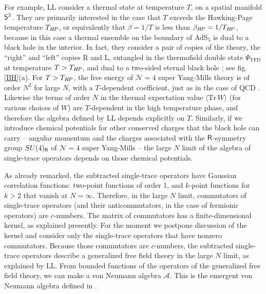 \documentclass[11pt,a4paper]{article}
\def\HP{{H\negthinspace P}}
\def\A{{\mathcal A}}
\def\S{{\sf S}}
\def\N{{\mathcal N}}
\def\la{\langle}
\def\ra{\rangle}
\def\Tr{\mathrm{Tr}}
\def\TFD{{\mathrm{TFD}}}
\def\Rr{{\sf R}}
\begin{document}
 For example, LL consider a thermal state at temperature $T$, on a spatial manifold $\S^3$.   They are primarily
interested in the case that $T$ exceeds the Hawking-Page temperature
$T_\HP$, or equivalently  that $\beta=1/T$ is less than $\beta_\HP=1/T_\HP$,
because in this case  a thermal ensemble on the boundary of AdS$_5$ is dual to a black hole in the interior.    In fact, they consider a pair of
copies of the theory, the ``right'' and ``left'' copies R and L, entangled in the thermofield double state $\Psi_\TFD$ at temperature $T>T_\HP$, and dual to
a two-sided eternal black hole \cite{Malda}; see fig. \ref{BH}(a).
For $T>T_\HP$, the free energy of $\N=4$ super Yang-Mills theory is of order $N^2$ for large $N$, with a $T$-dependent coefficient,
just as in the case of QCD \cite{Thorn}.
  Likewise the terms of order $N$ in the thermal expectation value $\la\Tr\,W\ra$ (for various choices of $W$) are $T$-dependent in the high temperature phase, and
  therefore the algebra defined by LL depends explicitly on $T$.
Similarly, if we introduce chemical potentials for other conserved charges that the black hole can carry -- angular momentum and the charges associated
with the $\Rr$-symmetry group $SU(4)_\Rr$ of $\N=4$ super Yang-Mills --  the large $N$ limit of the algebra of single-trace operators depends on those chemical 
potentials.


As already remarked, the subtracted single-trace operators have Gaussian correlation functions:  two-point functions  of order 1, and $k$-point functions
for $k>2$ that vanish at $N=\infty$.   Therefore, in the large $N$ limit,  commutators of single-trace operators (and their anticommutators, in the case of
fermionic operators) are $c$-numbers.   The matrix
of commutators has a finite-dimensional kernel, as explained presently.   For the moment we postpone discussion of the kernel and consider only the single-trace
operators that have nonzero commutators.     Because those commutators are $c$-numbers, the subtracted single-trace operators describe a generalized free field theory
in the large $N$ limit,  as explained by LL.
From bounded functions of the operators of the generalized free field theory, we can make a von Neumann algebra $\A$. This is the emergent  von Neumann
algebra defined in \cite{LL,LL2}.
\end{document}
